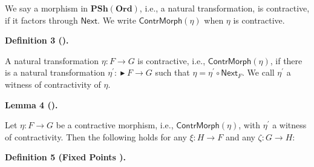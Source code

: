  
 
We say a morphism in $\mathbf{PSh}(\mathbf{Ord})$, i.e., a natural transformation, is contractive, if it factors through $\mathsf{Next}{}$. We write $\mathsf{ContrMorph}(\eta)$ when $\eta$ is contractive.\par
 
 
 
\par\medskip\noindent\textbf{Definition 3 ().}\par
 
 
A natural transformation $\eta:F\to G$ is contractive, i.e., $\mathsf{ContrMorph}(\eta)$, if there is a natural transformation $\eta^{\prime}:\mathop{\blacktriangleright}F\to G$ such that $\eta=\eta^{\prime}\circ\mathsf{Next}_{F}$. We call $\eta^{\prime}$ a witness of contractivity of $\eta$.\par
 
 
 
 
\par\medskip\noindent\textbf{Lemma 4 ().}\par
 
 
Let $\eta:F\to G$ be a contractive morphism, i.e., $\mathsf{ContrMorph}(\eta)$, with $\eta^{\prime}$ a witness of contractivity. Then the following holds for any $\xi:H\to F$ and any $\zeta:G\to H$:\par
 
\begin{center}\end{center}
 
 
 
 
\par\medskip\noindent\textbf{Definition 5 (Fixed Points ).}\par
 

